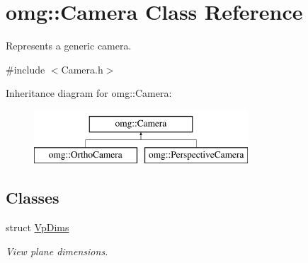 \hypertarget{classomg_1_1_camera}{}\section{omg\+::Camera Class Reference}
\label{classomg_1_1_camera}


Represents a generic camera.  




{\ttfamily \#include $<$Camera.\+h$>$}

Inheritance diagram for omg\+::Camera\+:\begin{figure}[H]
\begin{center}
\leavevmode
\includegraphics[height=2.000000cm]{classomg_1_1_camera}
\end{center}
\end{figure}
\subsection*{Classes}
\begin{DoxyCompactItemize}
\item 
struct \mbox{\hyperlink{structomg_1_1_camera_1_1_vp_dims}{Vp\+Dims}}
\begin{DoxyCompactList}\small\item\em View plane dimensions. \end{DoxyCompactList}\end{DoxyCompactItemize}
